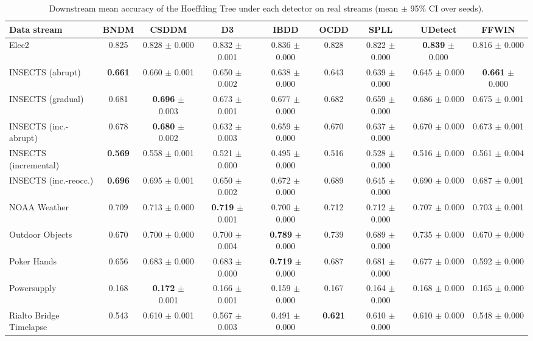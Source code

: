 \begin{table}[!t]
\centering
\caption{Downstream mean accuracy of the Hoeffding Tree under each detector on real streams (mean $\pm$ 95\% CI over seeds).}
\label{tab:acc_ht_detectors}
\footnotesize
\setlength{\tabcolsep}{4pt}
\begin{tabular}{@{}lcccccccc@{}}
\toprule
\textbf{Data stream} & \textbf{BNDM} & \textbf{CSDDM} & \textbf{D3} & \textbf{IBDD} & \textbf{OCDD} & \textbf{SPLL} & \textbf{UDetect} & \textbf{FFWIN} \\
\midrule
Elec2 & 0.825 & 0.828 $\pm$ 0.000 & 0.832 $\pm$ 0.001 & 0.836 $\pm$ 0.000 & 0.828 & 0.822 $\pm$ 0.000 & \textbf{0.839} $\pm$ 0.000 & 0.816 $\pm$ 0.000 \\
INSECTS (abrupt) & \textbf{0.661} & 0.660 $\pm$ 0.001 & 0.650 $\pm$ 0.002 & 0.638 $\pm$ 0.000 & 0.643 & 0.639 $\pm$ 0.000 & 0.645 $\pm$ 0.000 & \textbf{0.661} $\pm$ 0.000 \\
INSECTS (gradual) & 0.681 & \textbf{0.696} $\pm$ 0.003 & 0.673 $\pm$ 0.001 & 0.677 $\pm$ 0.000 & 0.682 & 0.659 $\pm$ 0.000 & 0.686 $\pm$ 0.000 & 0.675 $\pm$ 0.001 \\
INSECTS (inc.-abrupt) & 0.678 & \textbf{0.680} $\pm$ 0.002 & 0.632 $\pm$ 0.003 & 0.659 $\pm$ 0.000 & 0.670 & 0.637 $\pm$ 0.000 & 0.670 $\pm$ 0.000 & 0.673 $\pm$ 0.001 \\
INSECTS (incremental) & \textbf{0.569} & 0.558 $\pm$ 0.001 & 0.521 $\pm$ 0.000 & 0.495 $\pm$ 0.000 & 0.516 & 0.528 $\pm$ 0.000 & 0.516 $\pm$ 0.000 & 0.561 $\pm$ 0.004 \\
INSECTS (inc.-reocc.) & \textbf{0.696} & 0.695 $\pm$ 0.001 & 0.650 $\pm$ 0.002 & 0.672 $\pm$ 0.000 & 0.689 & 0.645 $\pm$ 0.000 & 0.690 $\pm$ 0.000 & 0.687 $\pm$ 0.001 \\
NOAA Weather & 0.709 & 0.713 $\pm$ 0.000 & \textbf{0.719} $\pm$ 0.001 & 0.700 $\pm$ 0.000 & 0.712 & 0.712 $\pm$ 0.000 & 0.707 $\pm$ 0.000 & 0.703 $\pm$ 0.001 \\
Outdoor Objects & 0.670 & 0.700 $\pm$ 0.000 & 0.700 $\pm$ 0.004 & \textbf{0.789} $\pm$ 0.000 & 0.739 & 0.689 $\pm$ 0.000 & 0.735 $\pm$ 0.000 & 0.670 $\pm$ 0.000 \\
Poker Hands & 0.656 & 0.683 $\pm$ 0.000 & 0.683 $\pm$ 0.000 & \textbf{0.719} $\pm$ 0.000 & 0.687 & 0.681 $\pm$ 0.000 & 0.677 $\pm$ 0.000 & 0.592 $\pm$ 0.000 \\
Powersupply & 0.168 & \textbf{0.172} $\pm$ 0.001 & 0.166 $\pm$ 0.001 & 0.159 $\pm$ 0.000 & 0.167 & 0.164 $\pm$ 0.000 & 0.168 $\pm$ 0.000 & 0.165 $\pm$ 0.000 \\
Rialto Bridge Timelapse & 0.543 & 0.610 $\pm$ 0.001 & 0.567 $\pm$ 0.003 & 0.491 $\pm$ 0.000 & \textbf{0.621} & 0.610 $\pm$ 0.000 & 0.610 $\pm$ 0.000 & 0.548 $\pm$ 0.000 \\
\bottomrule
\end{tabular}
\end{table}
